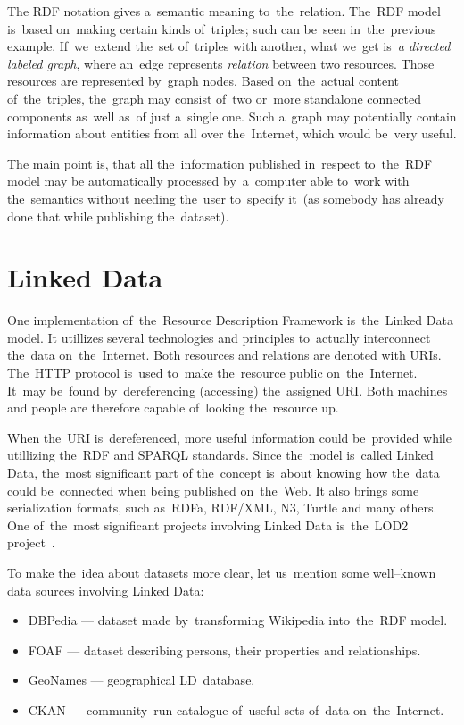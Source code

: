 The RDF notation gives a~semantic meaning to~the~relation. The~RDF model is~based on~making certain
kinds of~triples; such can be~seen in~the~previous example. If~we~extend the~set of~triples with another,
what we~get is~\emph{a directed labeled graph}, where an~edge represents \emph{relation} between two resources.
Those resources are represented by~graph nodes. Based on~the~actual content of~the~triples,
the~graph may consist of~two or~more standalone connected components as~well as~of
just a~single one. Such a~graph may potentially contain information about entities from all over
the~Internet, which would be~very useful.

The main point is, that all the~information published in~respect to~the~RDF model may be
automatically processed by~a~computer able to~work with the~semantics without
needing the~user to~specify it~(as somebody has already done that while publishing the~dataset).

\section{Linked Data}

One implementation of~the~Resource Description Framework is~the~Linked Data model.
It utillizes several technologies and principles to~actually interconnect the~data on~the~Internet.
Both resources and relations are denoted with URIs. The~HTTP protocol is~used to~make
the~resource public on~the~Internet. It~may be~found by~dereferencing (accessing) the~assigned
URI. Both machines and people are therefore capable of~looking the~resource up.

When the~URI is~dereferenced, more useful information could be~provided while utillizing the~RDF
and SPARQL standards. Since the~model is~called Linked Data, the~most significant part
of the~concept is~about knowing how the~data could be~connected when being published on~the~Web.
It also brings some serialization formats, such as~RDFa, RDF/XML, N3, Turtle and many others.
One of~the~most significant projects involving Linked Data is~the~LOD2 project~\cite{lod2}.

To make the~idea about datasets more clear, let us~mention some well--known data sources
involving Linked Data:

\begin{itemize}
\item DBPedia --- dataset made by~transforming Wikipedia into~the~RDF model.
\item FOAF --- dataset describing persons, their properties and relationships.
\item GeoNames --- geographical LD~database.
\item CKAN --- community--run catalogue of~useful sets of~data on~the~Internet.
\end{itemize}

